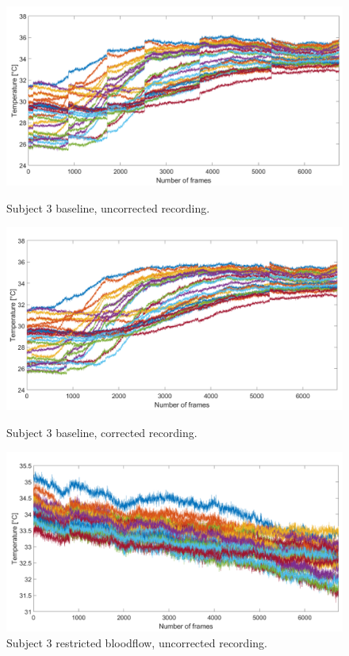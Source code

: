 \begin{figure}[htbp]
	\begin{minipage}[b]{0.45\linewidth}
		\centering
		\includegraphics[width=\linewidth]{figures/Recordings/Sub3_uncuffed_uncorr}
		\caption{Subject 3 baseline, uncorrected recording.}
		\label{fig:chapter001_dist_001}
	\end{minipage}
	\hspace{0.2cm}
	\begin{minipage}[b]{0.45\linewidth}
		\centering
		\includegraphics[width=\linewidth]{figures/Recordings/Sub3_uncuffed_corr}
		\caption{Subject 3 baseline, corrected recording.}
		\label{fig:chapter001_reward_001}
	\end{minipage}
	\hspace{0.2cm}
	\begin{minipage}[b]{0.45\linewidth}
		\centering
		\includegraphics[width=\linewidth]{figures/Recordings/Sub3_cuffed_uncorr}
		\caption{Subject 3 restricted bloodflow, uncorrected recording.}
	

\end{minipage}
\end{figure}
